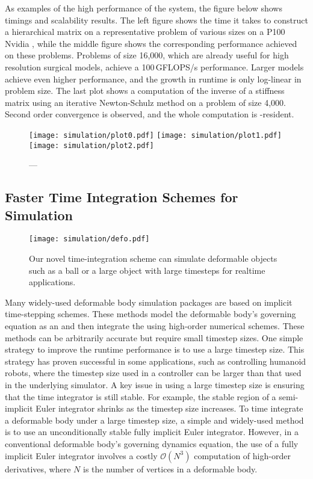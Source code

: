 As examples of the high performance of the system, the figure below shows  timings and scalability results. The left figure shows the time it takes to construct a hierarchical matrix on a representative problem of various sizes on a P100 Nvidia , while the middle figure shows the corresponding performance achieved on these problems. Problems of size 16,000, which are already useful for high resolution surgical models, achieve a 100\,GFLOPS/s performance. Larger models achieve even higher performance, and the growth in runtime is only log-linear in problem size. The last plot shows a computation of the inverse of a stiffness matrix using an iterative Newton-Schulz method on a problem of size 4,000. Second order convergence is observed, and the whole computation is -resident.

\begin{figure}
  \centering%
  \texttt{[image: simulation/plot0.pdf]}
  \hfill%
  \texttt{[image: simulation/plot1.pdf]}
  \hfill%
  \texttt{[image: simulation/plot2.pdf]}
  \vspace{-15ex}
  \caption{---}\label{fig:plots}
\end{figure}

\subsection{Faster Time Integration Schemes for Simulation}
\begin{figure}[ht]
  \centering
  \texttt{[image: simulation/defo.pdf]}
  \caption{Our novel time-integration scheme  can simulate deformable objects such as a ball or a large object with large timesteps for realtime applications.}\label{fig:pbdd}
\end{figure}

Many widely-used deformable body simulation packages are based on implicit time-stepping schemes. These methods model the deformable body's governing equation as an  and then integrate the  using high-order numerical schemes. These methods can be arbitrarily accurate but require small timestep sizes. One simple strategy to improve the runtime performance is to use a large timestep size. This strategy has proven successful in some applications, such as controlling humanoid robots, where the timestep size used in a controller can be larger than that used in the underlying simulator. A key issue in using a large timestep size is ensuring that the time integrator is still stable. For example, the stable region of a semi-implicit Euler integrator shrinks as the timestep size increases. To time integrate a deformable body under a large timestep size, a simple and widely-used method is to use an unconditionally stable fully implicit Euler integrator. However, in a conventional deformable body's governing dynamics equation, the use of a fully implicit Euler integrator involves a costly $\mathcal{O}(N^3)$ computation of high-order derivatives, where $N$ is the number of vertices in a deformable body.

